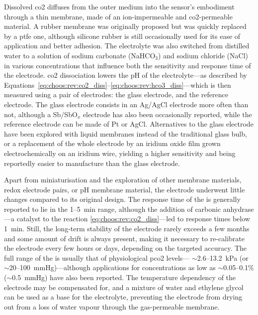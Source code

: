Dissolved \gls{co2} diffuses from the outer medium into the sensor's embodiment through a thin membrane, made of an ion-impermeable and \gls{co2}-permeable material. A rubber membrane was originally proposed but was quickly replaced by a \gls{ptfe} one\cite{severinghaus1986_3, severinghaus1958}, although silicone rubber is still occasionally used for its ease of application and better adhesion\cite{shin2000}. The electrolyte was also switched from distilled water to a solution of sodium carbonate (NaHCO$_3$) and sodium chloride (NaCl) in various concentrations that influence both the sensitivity and response time of the electrode\cite{jensen1979}. \gls{co2} dissociation lowers the pH of the electrolyte---as described by Equations~\ref{eq:choos:rev:co2_diss}--\ref{eq:choos:rev:hco3_diss}---which is then measured using a pair of electrodes: the glass electrode, and the reference electrode. The glass electrode consists in an Ag/AgCl electrode more often than not, although a Sb/SbO$_x$ electrode has also been occasionally reported\cite{beran1976}, while the reference electrode can be made of Pt\cite{severinghaus1958, severinghaus1981} or AgCl\cite{beran1976}. Alternatives to the glass electrode have been explored with liquid membranes instead of the traditional glass bulb\cite{zhao1997}, or a replacement of the whole electrode by an iridium oxide film grown electrochemically on an iridium wire, yielding a higher sensitivity and being reportedly easier to manufacture than the glass electrode\cite{suzuki1999, beyenal2004}.

Apart from miniaturisation and the exploration of other membrane materials, redox electrode pairs, or pH membrane material, the electrode underwent little changes compared to its original design. The response time of the \ssel{} is generally reported to lie in the 1--5~min range, although the addition of carbonic anhydrase---a catalyst to the reaction \ref{eq:choos:rev:co2_diss}---led to response times below 1~min\cite{donaldson1979, shin2000}. Still, the long-term stability of the electrode rarely exceeds a few months and some amount of drift is always present, making it necessary to re-calibrate the electrode every few hours or days, depending on the targeted accuracy\cite{zhao1997, mcguire2002}. The full range of the \ssel{} is usually that of physiological \gls{pco2} levels---\ie{} $\sim$2.6--13.2~kPa (or $\sim$20--100~mmHg)\cite{conway2018}---although applications for concentrations as low as $\sim$0.05--0.1\% ($\sim$0.5~mmHg) have also been reported\cite{cai1993, zhao1997}. The temperature dependency of the electrode may be compensated for, and a mixture of water and ethylene glycol can be used as a base for the electrolyte, preventing the electrode from drying out from a loss of water vapour through the gas-permeable membrane\cite{whitehead1980}.

